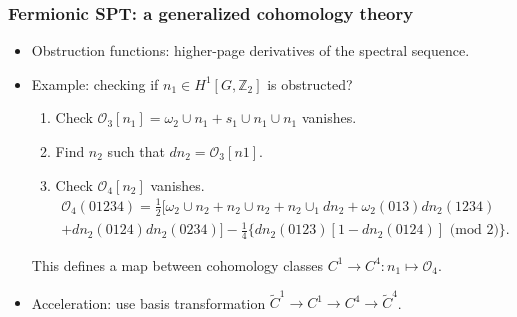 \documentclass[xcolor=table, 11pt, aspectratio=1610]{beamer}
\newcommand{\uone}{\mathrm U(1)}
\begin{document}
\begin{frame}
	\frametitle{Fermionic SPT: a generalized cohomology theory}
	\begin{itemize}
		\item Obstruction functions: higher-page derivatives of the spectral sequence.
		\item Example: checking if $n_1\in H^1[G, \mathbb Z_2]$ is obstructed?
		\begin{enumerate}
			\item Check $\mathcal O_3[n_1] = \omega_2\cup n_1 + s_1\cup n_1\cup n_1$ vanishes.
			\item Find $n_2$ such that $dn_2 = \mathcal O_3[n1]$.
			\item Check $\mathcal O_4[n_2]$ vanishes.
			\begin{align*}\mathcal O_4(01234) = \frac12\big[\omega_2\cup n_2 + n_2\cup n_2 + n_2 \cup_1 dn_2 + \omega_2(013)dn_2(1234)\\ + dn_2(0124)dn_2(0234)\big]
			-\frac14\big\{dn_2(0123)[1-dn_2(0124)]\text{ (mod 2)}\big\}.
		\end{align*}
		\end{enumerate}
		This defines a map between cohomology classes
		$C^1\rightarrow C^4:n_1\mapsto \mathcal O_4$.
		\item Acceleration: use basis transformation $\tilde C^1\rightarrow C^1\rightarrow C^4\rightarrow\tilde C^4$.
	\end{itemize}
\end{frame}

\end{document}
